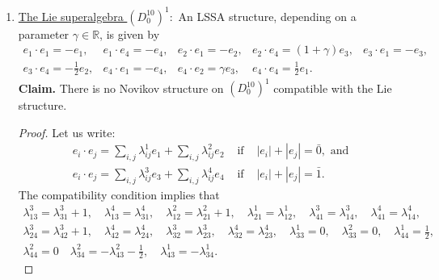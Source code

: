 \documentclass[12pt]{amsart}
\begin{document}
\begin{enumerate}
\[\begin{array}{lllll}
\end{array}
 \]
A Balinsky-Novikov structure, depending on parameters $\lambda, \gamma \in \mathbb R$, is given by
 \[
 \begin{array}{llll}
e_1 \cdot e_1= (\gamma-1) e_1+\lambda e_2, & e_1\cdot e_2= \gamma e_2, & e_1\cdot e_3=\frac{\gamma}{2} e_3-pe_4, & e_1\cdot e_4= p e_3+\frac{\gamma}{2}e_4,\\[2mm]
e_2\cdot e_1=(\gamma-1) e_2, & e_3\cdot e_1= (\gamma-1) e_3, & e_3\cdot e_3= e_2, &  e_4\cdot e_1= (\gamma-1)e_4,\\[2mm]
e_4\cdot e_4=e_2.
 \end{array}
 \]
    \item \underline{The Lie superalgebra $(D^{10}_{0})^1:$} An  LSSA structure, depending on a parameter $\gamma \in \mathbb R$, is given by 
 \[
 \begin{array}{lllll}
e_1\cdot e_1=- e_1, & e_1\cdot e_4=- e_4, & e_2\cdot e_1= - e_2, & e_2\cdot e_4= (1+\gamma) e_3, & e_3\cdot e_1=- e_3,\\[2mm]
e_3 \cdot e_4= - \frac{1}{2}e_2, & e_4\cdot e_1=- e_4, & e_4\cdot e_2=\gamma e_3, & e_4\cdot e_4=\frac{1}{2} e_1.
\end{array}
 \]
{\bf Claim.} There is no Novikov structure on $(D^{10}_{0})^1$ compatible with the Lie structure. 
\begin{proof}
Let us write: 
\[
\begin{array}{lll}
e_i\cdot e_j=\sum_{i,j} \lambda^1_{ij}e_1+\sum_{i,j} \lambda^2_{ij}e_2 & \text{ if } & |e_i|+|e_j|={\bar 0}, \text{ and }\\[2mm]
e_i\cdot e_j=\sum_{i,j} \lambda^3_{ij}e_3+\sum_{i,j} \lambda^4_{ij}e_4 & \text{ if } & |e_i|+|e_j|={\bar 1}.
\end{array}
\]
The compatibility condition implies that
\[
\begin{array}{l}
\lambda^3_{13}=\lambda_{31}^3+1, \quad \lambda^4_{13}=\lambda_{31}^4, \quad \lambda^2_{12}=\lambda_{21}^2+1, \quad \lambda^1_{21}=\lambda_{12}^1, \quad 
\lambda^3_{41}=\lambda_{14}^3, \quad \lambda^4_{41}=\lambda_{14}^4,\\[3mm]
\lambda^3_{24}=\lambda_{42}^3+1, \quad \lambda^4_{42}=\lambda_{24}^4, \quad
\lambda^3_{32}=\lambda_{23}^3, \quad \lambda^4_{32}=\lambda_{23}^4, \quad 
\lambda^1_{33}=0, \quad \lambda^2_{33}=0,\quad 
\lambda^1_{44}=\frac{1}{2}, \\[3mm]
\lambda^2_{44}=0 \quad \lambda^2_{34}=-\lambda^2_{43}- \frac{1}{2}, \quad \lambda^1_{43}=-\lambda^1_{34}.
\end{array}
\]
\end{proof}
\end{enumerate}
\end{document}
